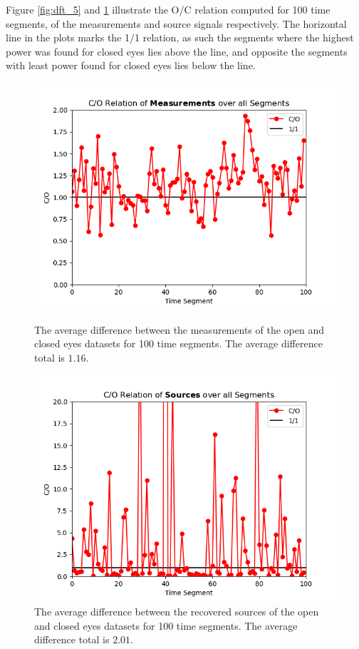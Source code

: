 Figure \ref{fig:dft_5} and \ref{fig:dft_6} illustrate the O/C relation computed for 100 time segments, of the measurements and source signals respectively. The horizontal line in the plots marks the 1/1 relation, as such the segments where the highest power was found for closed eyes lies above the line, and opposite the segments with least power found for closed eyes lies below the line.      
\begin{figure}[H]
\begin{widepage}
    \begin{minipage}[t]{.49\textwidth}
\centering
\includegraphics[width=1\linewidth]{figures/ch_7/DFT_Y_Difference.png}
\caption{The average difference between the measurements of the open and closed eyes datasets for 100 time segments. The average difference total is $1.16$.}
\label{fig:dft_5}
\end{minipage} 
\hspace{.5cm}
\begin{minipage}[t]{.49\textwidth}
\centering
\includegraphics[width=1\linewidth]{figures/ch_7/DFT_X_Difference.png}
\caption{The average difference between the recovered sources of the open and closed eyes datasets for 100 time segments. The average difference total is $2.01$.}
	\label{fig:dft_6}
    \end{minipage}
\end{widepage}
\end{figure}
